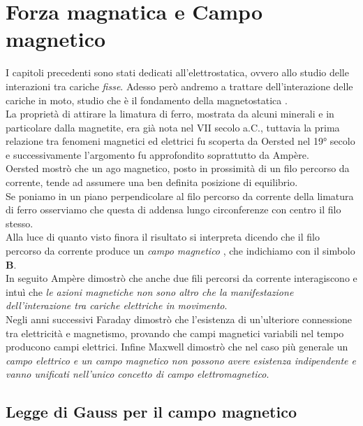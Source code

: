 \chapter{Forza magnatica e Campo magnetico}

I capitoli precedenti sono stati dedicati all'elettrostatica, ovvero allo studio delle interazioni tra cariche \emph{fisse}. Adesso però andremo a trattare dell'interazione delle cariche in moto, studio che è il fondamento della magnetostatica . \\

La proprietà di attirare la limatura di ferro, mostrata da alcuni minerali e in particolare dalla magnetite, era già nota nel VII secolo a.C., tuttavia la prima relazione tra fenomeni magnetici ed elettrici fu scoperta da Oersted nel 19° secolo e successivamente l'argomento fu approfondito soprattutto da Ampère. \\

Oersted mostrò che un ago magnetico, posto in prossimità di un filo percorso da corrente, tende ad assumere una ben definita posizione di equilibrio.\\
Se poniamo in un piano perpendicolare al filo percorso da corrente della limatura di ferro osserviamo che questa di addensa lungo circonferenze con centro il filo stesso. \\
Alla luce di quanto visto finora il risultato si interpreta dicendo che il filo percorso da corrente produce un \emph{campo magnetico} , che indichiamo con il simbolo $\mathbf{B}$.\\
In seguito Ampère dimostrò che anche due fili percorsi da corrente interagiscono e intuì che \emph{le azioni magnetiche non sono altro che la manifestazione dell'interazione tra cariche elettriche in movimento}.\\

Negli anni successivi Faraday dimostrò che l'esistenza di un'ulteriore connessione tra elettricità e magnetismo, provando che campi magnetici variabili nel tempo producono campi elettrici. Infine Maxwell dimostrò che nel caso più generale un \emph{campo elettrico e un campo magnetico non possono avere esistenza indipendente e vanno unificati nell'unico concetto di campo elettromagnetico}. 


\section{Legge di Gauss per il campo magnetico}

